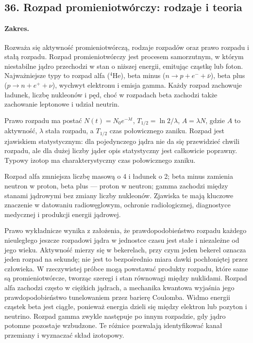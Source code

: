 \documentclass[11pt,a4paper]{article}
\begin{document}
\subsection{36. Rozpad promieniotwórczy: rodzaje i teoria}
\paragraph{Zakres.} Rozważa się aktywność promieniotwórczą, rodzaje rozpadów oraz prawo rozpadu i stałą rozpadu. Rozpad promieniotwórczy jest procesem samorzutnym, w którym niestabilne jądro przechodzi w stan o niższej energii, emitując cząstkę lub foton. Najważniejsze typy to rozpad alfa ($^4\mathrm{He}$), beta minus ($n\to p+e^-+\bar\nu$), beta plus ($p\to n+e^++\nu$), wychwyt elektronu i emisja gamma. Każdy rozpad zachowuje ładunek, liczbę nukleonów i pęd, choć w rozpadach beta zachodzi także zachowanie leptonowe i udział neutrin.\par
Prawo rozpadu ma postać $N(t)=N_0e^{-\lambda t}$, $T_{1/2}=\ln2/\lambda$, $A=\lambda N$, gdzie $A$ to aktywność, $\lambda$ stała rozpadu, a $T_{1/2}$ czas połowicznego zaniku. Rozpad jest zjawiskiem statystycznym: dla pojedynczego jądra nie da się przewidzieć chwili rozpadu, ale dla dużej liczby jąder opis statystyczny jest całkowicie poprawny. Typowy izotop ma charakterystyczny czas połowicznego zaniku.\par
Rozpad alfa zmniejsza liczbę masową o 4 i ładunek o 2; beta minus zamienia neutron w proton, beta plus — proton w neutron; gamma zachodzi między stanami jądrowymi bez zmiany liczby nukleonów. Zjawiska te mają kluczowe znaczenie w datowaniu radiowęglowym, ochronie radiologicznej, diagnostyce medycznej i produkcji energii jądrowej.\par

Prawo wykładnicze wynika z założenia, że prawdopodobieństwo rozpadu każdego nieuległego jeszcze rozpadowi jądra w jednostce czasu jest stałe i niezależne od jego wieku. Aktywność mierzy się w bekerelach, przy czym jeden bekerel oznacza jeden rozpad na sekundę; nie jest to bezpośrednio miara dawki pochłoniętej przez człowieka. W rzeczywistej próbce mogą powstawać produkty rozpadu, które same są promieniotwórcze, tworząc szeregi i stan równowagi między nuklidami. Rozpad alfa zachodzi często w ciężkich jądrach, a mechanika kwantowa wyjaśnia jego prawdopodobieństwo tunelowaniem przez barierę Coulomba. Widmo energii cząstek beta jest ciągłe, ponieważ energia dzieli się między elektron lub pozyton i neutrino. Rozpad gamma zwykle następuje po innym rozpadzie, gdy jądro potomne pozostaje wzbudzone. Te różnice pozwalają identyfikować kanał przemiany i wyznaczać skład izotopowy.
\par
\end{document}
